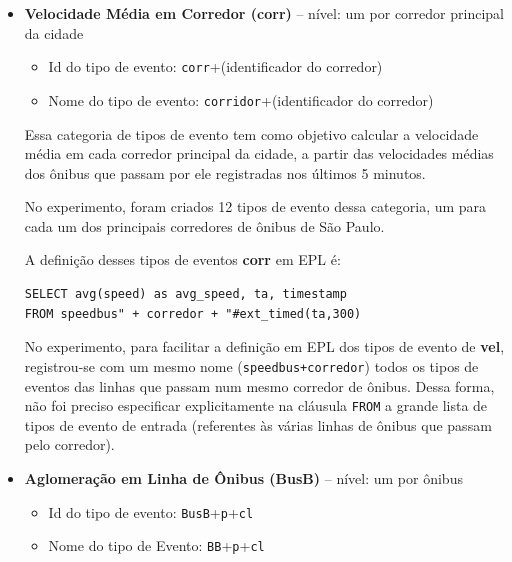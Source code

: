 \begin{itemize}

\item \textbf{Velocidade Média em Corredor (corr)} -- nível: um por corredor principal da cidade

\begin{itemize}
    \item Id do tipo de evento: \texttt{corr}+(identificador do corredor)
    \item Nome do tipo de evento: \texttt{corridor}+(identificador do corredor)
\end{itemize}


Essa categoria de tipos de evento tem como objetivo calcular a velocidade média em cada corredor principal da cidade, a partir das velocidades médias dos ônibus que passam por ele registradas nos últimos 5 minutos. 

No experimento, foram criados 12 tipos de evento dessa categoria, um para cada um dos principais corredores de ônibus de São Paulo.

A definição desses tipos de eventos \textbf{corr} em EPL é:
\begin{verbatim}
SELECT avg(speed) as avg_speed, ta, timestamp 
FROM speedbus" + corredor + "#ext_timed(ta,300)
\end{verbatim}

No experimento, para facilitar a definição em EPL dos tipos de evento de \textbf{vel}, registrou-se com um mesmo nome (\texttt{speedbus+corredor}) todos os tipos de eventos das linhas que passam num mesmo corredor de ônibus. Dessa forma, não foi preciso especificar explicitamente na cláusula \texttt{FROM} a grande lista de tipos de evento de entrada (referentes às várias linhas de ônibus que passam pelo corredor).

\item \textbf{Aglomeração em Linha de Ônibus (BusB)} -- nível: um por ônibus

\begin{itemize}
    \item Id do tipo de evento: \texttt{BusB}+\texttt{p}+\texttt{cl}
    \item Nome do tipo de Evento: \texttt{BB}+\texttt{p}+\texttt{cl}
\end{itemize}


\end{itemize}
